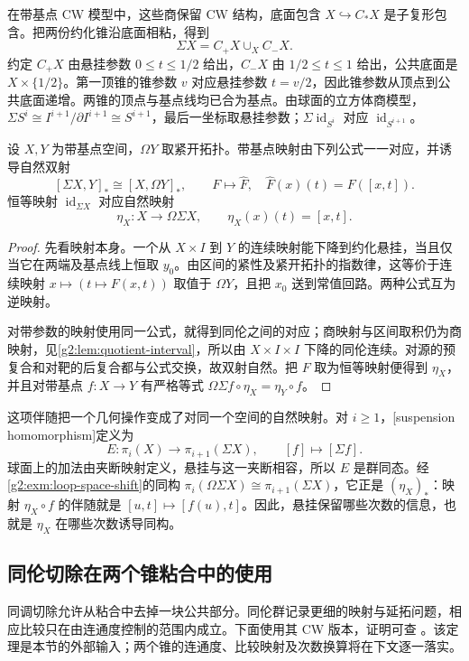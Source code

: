 在带基点 CW 模型中，这些商保留 CW 结构，底面包含 \(X\hookrightarrow C_*X\) 是子复形包含。把两份约化锥沿底面相粘，得到
\[
	\Sigma X=C_+X\cup_X C_-X.
\]
约定 \(C_+X\) 由悬挂参数 \(0\le t\le1/2\) 给出，\(C_-X\) 由 \(1/2\le t\le1\) 给出，公共底面是 \(X\times\{1/2\}\)。第一顶锥的锥参数 \(v\) 对应悬挂参数 \(t=v/2\)，因此锥参数从顶点到公共底面递增。两锥的顶点与基点线均已合为基点。由球面的立方体商模型，\(\Sigma S^i\cong I^{i+1}/\partial I^{i+1}\cong S^{i+1}\)，最后一坐标取悬挂参数；\(\Sigma\operatorname{id}_{S^i}\) 对应 \(\operatorname{id}_{S^{i+1}}\)。

\begin{proposition}\label{g2:prop:suspension-loop-adjunction}
	设 \(X,Y\) 为带基点空间，\(\Omega Y\) 取紧开拓扑。带基点映射由下列公式一一对应，并诱导自然双射
	\[
		[\Sigma X,Y]_*\cong[X,\Omega Y]_*,\qquad
		F\longmapsto\widehat F,\quad \widehat F(x)(t)=F([x,t]).
	\]
	恒等映射 \(\operatorname{id}_{\Sigma X}\) 对应自然映射
	\[
		\eta_X:X\longrightarrow\Omega\Sigma X,\qquad
		\eta_X(x)(t)=[x,t].
	\]
\end{proposition}
\begin{proof}
	先看映射本身。一个从 \(X\times I\) 到 \(Y\) 的连续映射能下降到约化悬挂，当且仅当它在两端及基点线上恒取 \(y_0\)。由区间的紧性及紧开拓扑的指数律，这等价于连续映射 \(x\mapsto(t\mapsto F(x,t))\) 取值于 \(\Omega Y\)，且把 \(x_0\) 送到常值回路。两种公式互为逆映射。

	对带参数的映射使用同一公式，就得到同伦之间的对应；商映射与区间取积仍为商映射，见\cref{g2:lem:quotient-interval}，所以由 \(X\times I\times I\) 下降的同伦连续。对源的预复合和对靶的后复合都与公式交换，故双射自然。把 \(F\) 取为恒等映射便得到 \(\eta_X\)，并且对带基点 \(f:X\rightarrow Y\) 有严格等式 \(\Omega\Sigma f\circ\eta_X=\eta_Y\circ f\)。
\end{proof}

这项伴随把一个几何操作变成了对同一个空间的自然映射。对 \(i\ge1\)，[suspension homomorphism]定义为
\[
	E:\pi_i(X)\longrightarrow\pi_{i+1}(\Sigma X),\qquad [f]\longmapsto[\Sigma f].
\]
球面上的加法由夹断映射定义，悬挂与这一夹断相容，所以 \(E\) 是群同态。经\cref{g2:exm:loop-space-shift}的同构 \(\pi_i(\Omega\Sigma X)\cong\pi_{i+1}(\Sigma X)\)，它正是 \((\eta_X)_*\)：映射 \(\eta_X\circ f\) 的伴随就是 \([u,t]\mapsto[f(u),t]\)。因此，悬挂保留哪些次数的信息，也就是 \(\eta_X\) 在哪些次数诱导同构。

\subsection{同伦切除在两个锥粘合中的使用}
\label{g2:subsec:0905:02}
同调切除允许从粘合中去掉一块公共部分。同伦群记录更细的映射与延拓问题，相应比较只在由连通度控制的范围内成立。下面使用其 CW 版本，证明可查 \cite[第4.2节，Excision for Homotopy Groups]{Hatcher2002}。该定理是本节的外部输入；两个锥的连通度、比较映射及次数换算将在下文逐一落实。

